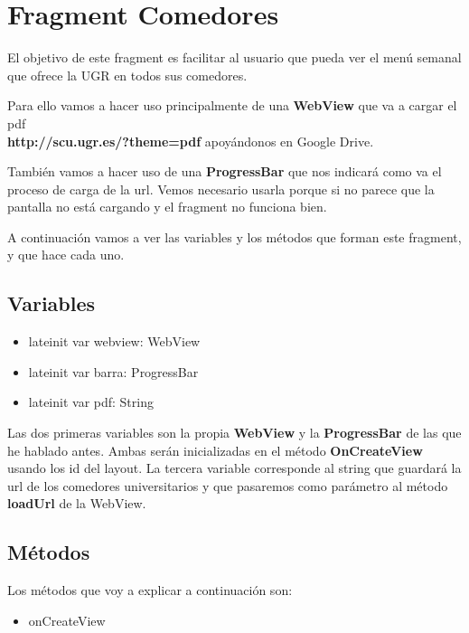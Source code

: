 \section{Fragment Comedores}


El objetivo de este fragment es facilitar al usuario que pueda ver el menú semanal que ofrece la UGR en todos sus comedores.

Para ello vamos a hacer uso principalmente de una \textbf{WebView} que va a cargar el pdf \\ \textbf{http://scu.ugr.es/?theme=pdf} apoyándonos en Google Drive.

También vamos a hacer uso de una \textbf{ProgressBar} que nos indicará como va el proceso de carga de la url. Vemos necesario usarla porque si no parece que la pantalla no está cargando y el fragment no funciona bien.

A continuación vamos a ver las variables y los métodos que forman este fragment, y que hace cada uno.

\subsection{Variables}

\begin{itemize}

\item{lateinit var webview: WebView}
\item{lateinit var barra: ProgressBar}
\item{lateinit var pdf: String}

\end{itemize}

Las dos primeras variables son la propia \textbf{WebView} y la \textbf{ProgressBar} de las que he hablado antes. Ambas serán inicializadas en el método \textbf{OnCreateView} usando los id del layout.
La tercera variable corresponde al string que guardará la url de los comedores universitarios y que pasaremos como parámetro al método \textbf{loadUrl} de la WebView.

\newpage

\subsection{Métodos}

Los métodos que voy a explicar a continuación son:

\begin{itemize}
\item{onCreateView}
\end{itemize}

